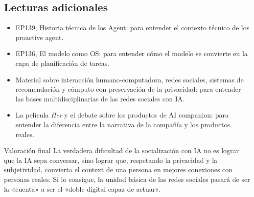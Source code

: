 \subsection{Lecturas adicionales}

\begin{itemize}
\item EP139, Historia técnica de los Agent: para entender el contexto técnico de los proactive agent.
\item EP136, El modelo como OS: para entender cómo el modelo se convierte en la capa de planificación de tareas.
\item Material sobre interacción humano-computadora, redes sociales, sistemas de recomendación y cómputo con preservación de la privacidad: para entender las bases multidisciplinarias de las redes sociales con IA.
\item La película \textit{Her} y el debate sobre los productos de AI companion: para entender la diferencia entre la narrativa de la compañía y los productos reales.
\end{itemize}

\begin{importantbox}{Valoración final}
La verdadera dificultad de la socialización con IA no es lograr que la IA sepa conversar, sino lograr que, respetando la privacidad y la subjetividad, convierta el context de una persona en mejores conexiones con personas reales. Si lo consigue, la unidad básica de las redes sociales pasará de ser la «cuenta» a ser el «doble digital capaz de actuar».\end{importantbox}


